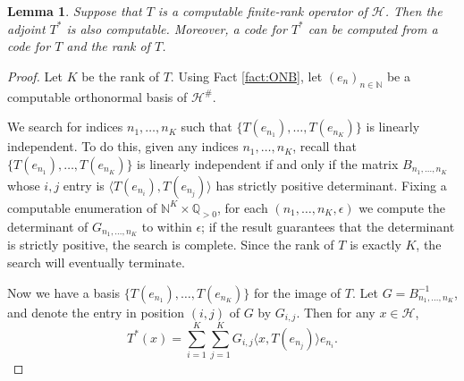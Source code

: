 \documentclass{amsart}
\theoremstyle{plain}
\newtheorem{lemma}[theorem]{Lemma}
\theoremstyle{definition}
\numberwithin{equation}{section}
\begin{document}
\begin{lemma}\label{lemma:Adjoint}
Suppose that $T$ is a computable finite-rank operator of $\mathcal{H}$.  Then the adjoint $T^*$ is also computable.  Moreover, a code for $T^*$ can be computed from a code for $T$ and the rank of $T$.
\end{lemma}
\begin{proof}
Let $K$ be the rank of $T$.  Using Fact \ref{fact:ONB}, let $(e_n)_{n \in \mathbb{N}}$ be a computable orthonormal basis of $\mathcal{H}^\#$.  

We search for indices $n_1, \ldots, n_K$ such that $\{T(e_{n_1}), \ldots, T(e_{n_K})\}$ is linearly independent.  To do this, given any indices $n_1, \ldots, n_K$, recall that $\{T(e_{n_1}), \ldots, T(e_{n_K})\}$ is linearly independent if and only if the matrix $B_{n_1, \ldots, n_K}$ whose $i,j$ entry is $\langle T(e_{n_i}), T(e_{n_j}) \rangle$ has strictly positive determinant.  Fixing a computable enumeration of $\mathbb{N}^K \times \mathbb{Q}_{>0}$, for each $(n_1, \ldots, n_K, \epsilon)$ we compute the determinant of $G_{n_1, \ldots, n_K}$ to within $\epsilon$; if the result guarantees that the determinant is strictly positive, the search is complete.  Since the rank of $T$ is exactly $K$, the search will eventually terminate.

Now we have a basis $\{T(e_{n_1}), \ldots, T(e_{n_K})\}$ for the image of $T$.  Let $G = B_{n_1, \ldots, n_K}^{-1}$, and denote the entry in position $(i, j)$ of $G$ by $G_{i,j}$.  Then for any $x \in \mathcal{H}$,
\[T^*(x) = \sum_{i=1}^K\sum_{j=1}^KG_{i,j}\langle x, T(e_{n_j}) \rangle e_{n_i}.\]
\end{proof}
\end{document}

